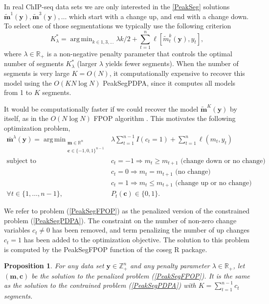 \documentclass{article}
\newtheorem{Proposition}{Proposition}
\DeclareMathOperator*{\argmin}{arg\,min}
\newcommand{\ZZ}{\mathbb Z}
\newcommand{\RR}{\mathbb R}
\begin{document}
In real ChIP-seq data sets we are only interested in the \ref{PeakSeg}
solutions
$\mathbf{\tilde m}^1(\mathbf y), \mathbf{\tilde m}^3(\mathbf y), \dots$
which start with a change up, and end with a change down. To select
one of those segmentations we typically use the following criterion
\begin{equation}
  \label{eq:selection}
  K^*_\lambda = \argmin_{k\in 1,3, \dots}
  \lambda k/2 +
\sum_{t=1}^n
  \ell[ \tilde m_t^k(\mathbf y),  y_t ],
\end{equation}
where $\lambda\in\RR_+$ is a non-negative penalty parameter 
that controls the optimal number of segments $K^*_\lambda$
(larger $\lambda$ yields fewer segments).
When the number of segments is very large $K =O(N)$, 
it computationally expensive to recover this model
using the $O(K N\log N)$ PeakSegPDPA, 
since it computes all models from 1 to $K$ segments.

It would be computationally faster if we could recover the model
$\mathbf{\tilde m}^{K}(\mathbf y)$ by itself, as in the $O(N\log N)$
FPOP algorithm \citep{johnson, FPOP}. This motivates the following
optimization problem,
\begin{align}
  \mathbf{\bar m}^\lambda(\mathbf y) =
    \argmin_{\substack{
  \mathbf m\in\RR^{n}
\\
  \mathbf c\in\{-1,0,1\}^{n-1}
  }} &\ \ 
\lambda\sum_{t=1}^{n-1} I(c_t =1)
+
\sum_{t=1}^n \ell( m_t,  y_t) 
  \label{PeakSegFPOP}
\\
    \text{subject to} 
& \ \ c_t = -1 \Rightarrow m_{t} \geq m_{t+1} \text{ (change down or no change)}
\nonumber\\
& \ \ c_t = 0 \Rightarrow m_{t} = m_{t+1}  \text{ (no change)}
\nonumber\\
& \ \ c_t = 1 \Rightarrow m_{t} \leq m_{t+1} \text{ (change up or no change)}
\nonumber\\
\forall t\in\{1, \dots, n-1\}, &\ \ P_t(\mathbf c) \in\{0, 1\}.
\nonumber
\end{align}

We refer to problem (\ref{PeakSegFPOP}) as the penalized version of
the constrained problem (\ref{PeakSegPDPA}). The constraint on the
number of non-zero change variables $c_t\neq 0$ has been removed, and
term penalizing the number of up changes $c_t=1$ has been added to the
optimization objective.  The solution to this problem is computed by
the PeakSegFPOP function of the coseg R package.

\begin{Proposition}
  For any data set $\mathbf y\in\ZZ_+^n$ and any penalty parameter
  $\lambda\in\RR_+$, let $(\mathbf m,\mathbf c)$ be the solution to
  the penalized problem (\ref{PeakSegFPOP}). It is the same as the
  solution to the contrained problem (\ref{PeakSegPDPA}) with
  $K=\sum_{t=1}^{n-1} c_t$ segments.
\end{Proposition}
\end{document}

